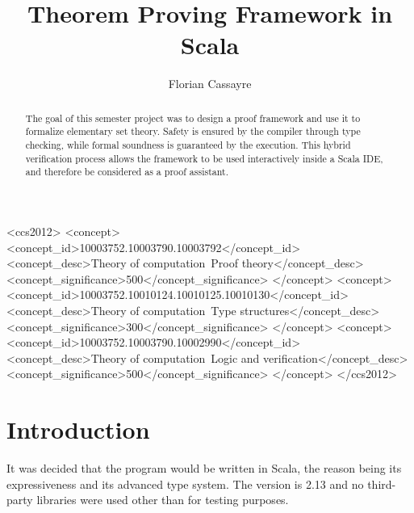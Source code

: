 \documentclass[acmlarge]{acmart}
\begin{document}
\title{Theorem Proving Framework in Scala}

\author{Florian Cassayre}

\renewcommand{\shortauthors}{Florian Cassayre}

\begin{abstract}
  The goal of this semester project was to design a proof framework
  and use it to formalize elementary set theory.
  Safety is ensured by the compiler through type checking,
  while formal soundness is guaranteed by the execution.
  This hybrid verification process allows the framework to be used interactively
  inside a Scala IDE, and therefore be considered as a proof assistant.
\end{abstract}

\begin{CCSXML}
<ccs2012>
<concept>
<concept_id>10003752.10003790.10003792</concept_id>
<concept_desc>Theory of computation~Proof theory</concept_desc>
<concept_significance>500</concept_significance>
</concept>
<concept>
<concept_id>10003752.10010124.10010125.10010130</concept_id>
<concept_desc>Theory of computation~Type structures</concept_desc>
<concept_significance>300</concept_significance>
</concept>
<concept>
<concept_id>10003752.10003790.10002990</concept_id>
<concept_desc>Theory of computation~Logic and verification</concept_desc>
<concept_significance>500</concept_significance>
</concept>
</ccs2012>
\end{CCSXML}



\maketitle

\section{Introduction}

It was decided that the program would be written in Scala, the reason being its expressiveness and its advanced type system. The version is 2.13 and no third-party libraries were used other than for testing purposes.
\end{document}
